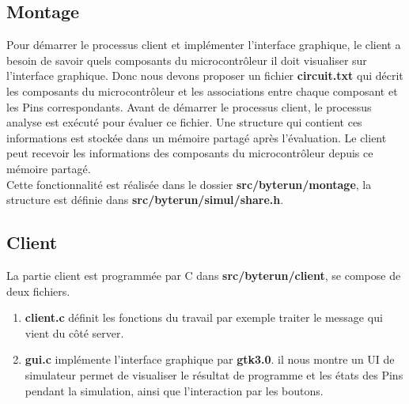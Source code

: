 \documentclass[14px]{article}
\begin{document}
\subsection{Montage}
Pour démarrer le processus client et implémenter l'interface graphique, le client a besoin de savoir quels composants du microcontrôleur il doit visualiser sur l'interface graphique. Donc
nous devons proposer un fichier \textbf{circuit.txt} qui décrit les composants du microcontrôleur et les associations entre chaque composant et les Pins correspondants. Avant de démarrer le processus client, le processus analyse est exécuté pour évaluer ce fichier. Une structure qui contient ces informations est stockée dans un mémoire partagé après l'évaluation. Le client peut recevoir les informations des composants du microcontrôleur depuis ce mémoire partagé.\\
Cette fonctionnalité est réalisée dans le dossier \textbf{src/byterun/montage}, la structure est définie dans \textbf{src/byterun/simul/share.h}.

\subsection{Client}
La partie client est programmée par C dans \textbf{src/byterun/client}, se compose de deux fichiers.
\begin{enumerate}
\item \textbf{client.c} définit les fonctions du travail par exemple traiter le message qui vient du côté server.

\item \textbf{gui.c} implémente l'interface graphique par \textbf{gtk3.0}.
il nous montre un UI de simulateur permet de visualiser le résultat de programme et les états des Pins pendant la simulation, ainsi que l'interaction par les boutons.\\
\end{enumerate}
\end{document}
